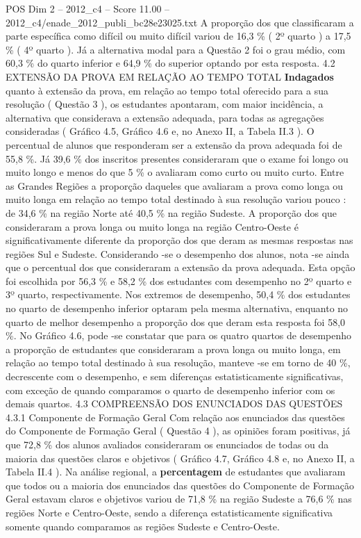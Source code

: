 \begin{textsample}{POS Dim 2 – 2012\_c4 – Score 11.00 – 2012\_c4/enade\_2012\_publi\_bc28e23025.txt}
A proporção dos que classificaram a parte específica como difícil ou muito difícil variou de 16,3 \% ( 2º quarto ) a 17,5 \% ( 4º quarto ).
Já a alternativa modal para a Questão 2 foi o grau médio, com 60,3 \% do quarto inferior e 64,9 \% do superior optando por esta resposta. 4.2 EXTENSÃO DA PROVA EM RELAÇÃO AO TEMPO TOTAL \textbf{Indagados} quanto à extensão da prova, em relação ao tempo total oferecido para a sua resolução ( Questão 3 ), os estudantes apontaram, com maior incidência, a alternativa que considerava a extensão adequada, para todas as agregações consideradas ( Gráfico 4.5, Gráfico 4.6 e, no Anexo II, a Tabela II.3 ).
O percentual de alunos que responderam ser a extensão da prova adequada foi de 55,8 \%.
Já 39,6 \% dos inscritos presentes consideraram que o exame foi longo ou muito longo e menos do que 5 \% o avaliaram como curto ou muito curto.
Entre as Grandes Regiões a proporção daqueles que avaliaram a prova como longa ou muito longa em relação ao tempo total destinado à sua resolução variou pouco : de 34,6 \% na região Norte até 40,5 \% na região Sudeste.
A proporção dos que consideraram a prova longa ou muito longa na região Centro-Oeste é significativamente diferente da proporção dos que deram as mesmas respostas nas regiões Sul e Sudeste.
Considerando -se o desempenho dos alunos, nota -se ainda que o percentual dos que consideraram a extensão da prova adequada.
Esta opção foi escolhida por 56,3 \% e 58,2 \% dos estudantes com desempenho no 2º quarto e 3º quarto, respectivamente.
Nos extremos de desempenho, 50,4 \% dos estudantes no quarto de desempenho inferior optaram pela mesma alternativa, enquanto no quarto de melhor desempenho a proporção dos que deram esta resposta foi 58,0 \%.
No Gráfico 4.6, pode -se constatar que para os quatro quartos de desempenho a proporção de estudantes que consideraram a prova longa ou muito longa, em relação ao tempo total destinado à sua resolução, manteve -se em torno de 40 \%, decrescente com o desempenho, e sem diferenças estatisticamente significativas, com exceção de quando comparamos o quarto de desempenho inferior com os demais quartos. 4.3 COMPREENSÃO DOS ENUNCIADOS DAS QUESTÕES 4.3.1 Componente de Formação Geral Com relação aos enunciados das questões do Componente de Formação Geral ( Questão 4 ), as opiniões foram positivas, já que 72,8 \% dos alunos avaliados consideraram os enunciados de todas ou da maioria das questões claros e objetivos ( Gráfico 4.7, Gráfico 4.8 e, no Anexo II, a Tabela II.4 ).
Na análise regional, a \textbf{percentagem} de estudantes que avaliaram que todos ou a maioria dos enunciados das questões do Componente de Formação Geral estavam claros e objetivos variou de 71,8 \% na região Sudeste a 76,6 \% nas regiões Norte e Centro-Oeste, sendo a diferença estatisticamente significativa somente quando comparamos as regiões Sudeste e Centro-Oeste.

\end{textsample}
